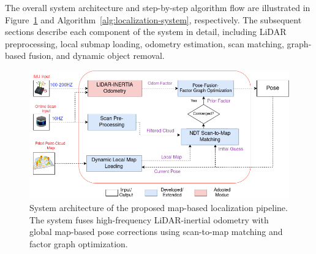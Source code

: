 The overall system architecture and step-by-step algorithm flow are illustrated in Figure~\ref{fig:diagram-map-basedlocalization} and Algorithm~\ref{alg:localization-system}, respectively. The subsequent sections describe each component of the system in detail, including LiDAR preprocessing, local submap loading, odometry estimation, scan matching, graph-based fusion, and dynamic object removal.



%	
%	
%	
%	
%	
%	

\begin{figure}[ht]
	\centering
	\includegraphics[width=0.95\linewidth]{images/system-overview.png}
	\caption{System architecture of the proposed map-based localization pipeline. The system fuses high-frequency LiDAR-inertial odometry with global map-based pose corrections using scan-to-map matching and factor graph optimization.}
	\label{fig:diagram-map-basedlocalization}
\end{figure}



